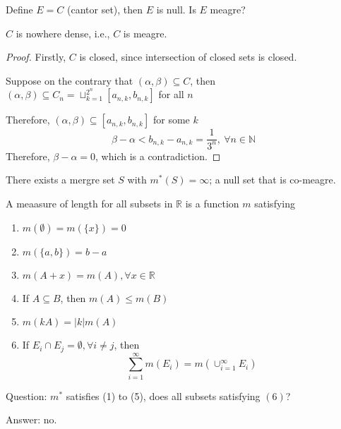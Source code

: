 Define $E = C$ (cantor set), then $E$ is null. Is $E$ meagre?
\begin{proposition}
$C$ is nowhere dense, i.e., $C$ is meagre.
\end{proposition}
\begin{proof}
Firstly, $C$ is closed, since intersection of closed sets is closed.

Suppose on the contrary that $(\alpha,\beta)\subseteq C$, then $(\alpha,\beta)\subseteq C_n = \sqcup_{k=1}^{2^n}[a_{n,k},b_{n,k}]$ for all $n$

Therefore, $(\alpha,\beta)\subseteq[a_{n,k},b_{n,k}]$ for some $k$
\[
\beta-\alpha<b_{n,k} - a_{n,k}=\frac{1}{3^n},\ \forall n\in\mathbb{N}
\]
Therefore, $\beta-\alpha=0$, which is a contradiction.
\end{proof}

There exists a mergre set $S$ with $m^*(S)=\infty$; a null set that is co-meagre.

\begin{definition}[Measure]
A meaasure of length for all subsets in $\mathbb{R}$ is a function $m$ satisfying
\begin{enumerate}
\item
$m(\emptyset) = m(\{x\})=0$
\item
$m(\{a,b\}) = b-a$
\item
$m(A+x) = m(A),\forall x\in\mathbb{R}$
\item
If $A\subseteq B$, then $m(A)\le m(B)$
\item
$m(kA) = |k|m(A)$
\item
If $E_i\cap E_j = \emptyset,\forall i\ne j$, then 
\[
\sum_{i=1}^\infty m(E_i) = m(\cup_{i=1}^\infty E_i)
\]
\end{enumerate}
\end{definition}
Question: $m^*$ satisfies (1) to (5), does all subsets satisfying $(6)$?

Answer: no.









